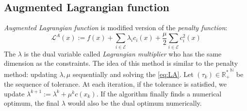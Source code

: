 \documentclass{report}
\begin{document}
\subsection{Augmented Lagrangian function}
\emph{Augmented Lagrangian function} is modified version of the \emph{penalty function}:
\begin{equation}
\label{eq:LA}
\mathcal{L}^A (x):= f(x) + \sum_{i \in \mathcal{E}} \lambda_i c_i(x) +\frac{\mu}{2} \sum_{i \in \mathcal{E}} c_i^2(x)
\end{equation}
The $\lambda$ is the dual variable called \emph{Lagrangian multiplier} who has the same dimension as the constraints. The idea of this method is similar to the penalty method: updating $\lambda, \mu$ sequentially and solving the \ref{eq:LA}. Let $(\tau_k) \in \mathbb{R^*_+}^\mathbb{N}$ be the sequence of tolerance. At each iteration, if the tolerance is satisfied, we update $\lambda^{k+1} := \lambda^{k} + \mu^k c(x_k)$. If the algorithm finally finds a numerical optimum, the final $\lambda$ would also be the dual optimum numerically.
\end{document}

